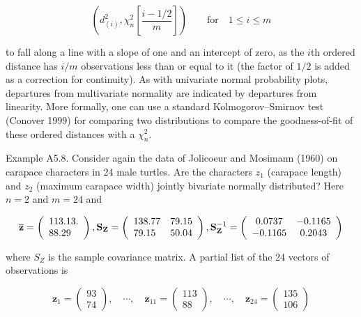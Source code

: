 \documentclass{article}
\begin{document}
\begin{equation}
\left(d_{(i)}^{2},\chi_{n}^{2}\left[\frac{i-1/2}{m}\right]\right)\qquad\mathrm{f o r}\quad1\leq i\leq m
\end{equation}

to fall along a line with a slope of one and an intercept of zero, as the  $ i $th ordered distance has  $ i/m $ observations less than or equal to it (the factor of  $ 1/2 $ is added as a correction for continuity). As with univariate normal probability plots, departures from multivariate normality are indicated by departures from linearity. More formally, one can use a standard Kolmogorov–Smirnov test (Conover 1999) for comparing two distributions to compare the goodness-of-fit of these ordered distances with a  $ \chi_n^2 $.

Example A5.8. Consider again the data of Jolicoeur and Mosimann (1960) on carapace characters in 24 male turtles. Are the characters  $ z_1 $ (carapace length) and  $ z_2 $ (maximum carapace width) jointly bivariate normally distributed? Here  $ n = 2 $ and  $ m = 24 $ and

\begin{equation}
\overline{\mathbf{z}}=\left(\begin{array}{l}113.13.\\ 88.29\end{array}\right),\mathbf{S}_{\mathbf{Z}}=\left(\begin{array}{l l}138.77&79.15\\ 79.15&50.04\end{array}\right),\mathbf{S}_{\mathbf{Z}}^{-1}=\left(\begin{array}{c c}0.0737&-0.1165\\ -0.1165&0.2043\end{array}\right)
\end{equation}

where  $ S_{Z} $ is the sample covariance matrix. A partial list of the 24 vectors of observations is

\begin{equation}
\mathbf{z}_{1}=\begin{pmatrix}93\\ 74\end{pmatrix},\quad\cdots,\quad\mathbf{z}_{11}=\begin{pmatrix}113\\ 88\end{pmatrix},\quad\cdots,\quad\mathbf{z}_{24}=\begin{pmatrix}135\\ 106\end{pmatrix}
\end{equation}
\end{document}
